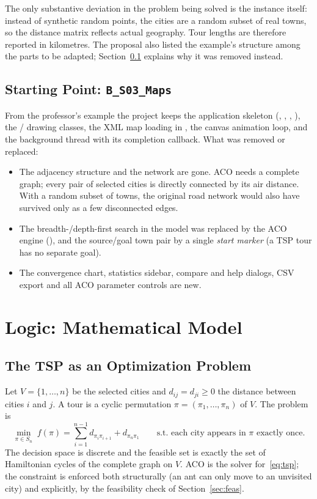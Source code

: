 \documentclass[11pt,a4paper]{article}
\begin{document}
The only substantive deviation in the problem being solved is the instance itself:
instead of synthetic random points, the cities are a random subset of real towns, so the distance
matrix reflects actual geography. Tour lengths are therefore reported in kilometres.
The proposal also listed the example's  structure among the parts to be adapted; Section~\ref{sec:b03} explains why it was removed instead.

\subsection{Starting Point: \texttt{B\_S03\_Maps}}\label{sec:b03}
From the professor's example the project keeps the application skeleton (,
, , ), the / drawing classes, the
XML map loading in , the canvas animation loop, and the background thread with its
completion callback. What was removed or replaced:
\begin{itemize}
  \item The  adjacency structure and the  network are gone. ACO needs a complete
        graph; every pair of selected cities is directly connected by its air distance. With a random
        subset of towns, the original road network would also have survived only as a few disconnected
        edges.
  \item The breadth-/depth-first search in the model was replaced by the ACO engine
        (), and the source/goal town pair by a single \emph{start marker} (a TSP tour
        has no separate goal).
  \item The convergence chart, statistics sidebar, compare and help dialogs, CSV export and all ACO
        parameter controls are new.
\end{itemize}

\section{Logic: Mathematical Model}

\subsection{The TSP as an Optimization Problem}
Let $V=\{1,\dots,n\}$ be the selected cities and $d_{ij}=d_{ji}\ge 0$ the distance between cities $i$ and
$j$. A tour is a cyclic permutation $\pi=(\pi_1,\dots,\pi_n)$ of $V$. The problem is
\begin{equation}
\min_{\pi\in S_n}\; f(\pi)=\sum_{i=1}^{n-1} d_{\pi_i\pi_{i+1}} + d_{\pi_n\pi_1}
\qquad\text{s.t. each city appears in }\pi\text{ exactly once.}
\label{eq:tsp}
\end{equation}
The decision space is discrete and the feasible set is exactly the set of Hamiltonian cycles of the
complete graph on $V$. ACO is the solver for~\eqref{eq:tsp}; the constraint is enforced both
structurally (an ant can only move to an unvisited city) and explicitly, by the feasibility check of
Section~\ref{sec:feas}.
\end{document}
